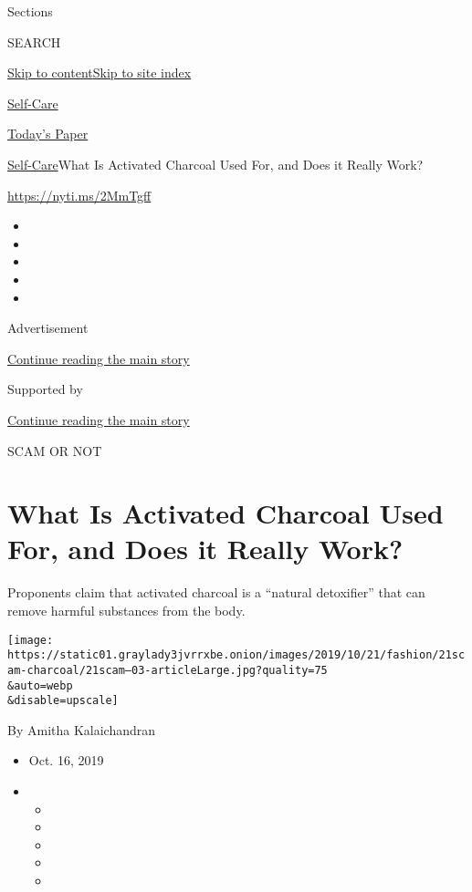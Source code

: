 Sections

SEARCH

\protect\hyperlink{site-content}{Skip to
content}\protect\hyperlink{site-index}{Skip to site index}

\href{https://www.nytimes3xbfgragh.onion/section/style/self-care/}{Self-Care}

\href{https://myaccount.nytimes3xbfgragh.onion/auth/login?response_type=cookie\&client_id=vi}{}

\href{https://www.nytimes3xbfgragh.onion/section/todayspaper}{Today's
Paper}

\href{/section/style/self-care/}{Self-Care}\textbar{}What Is Activated
Charcoal Used For, and Does it Really Work?

\url{https://nyti.ms/2MmTgff}

\begin{itemize}
\item
\item
\item
\item
\item
\end{itemize}

Advertisement

\protect\hyperlink{after-top}{Continue reading the main story}

Supported by

\protect\hyperlink{after-sponsor}{Continue reading the main story}

SCAM OR NOT

\hypertarget{what-is-activated-charcoal-used-for-and-does-it-really-work}{%
\section{What Is Activated Charcoal Used For, and Does it Really
Work?}\label{what-is-activated-charcoal-used-for-and-does-it-really-work}}

Proponents claim that activated charcoal is a ``natural detoxifier''
that can remove harmful substances from the body.

\texttt{[image: https://static01.graylady3jvrrxbe.onion/images/2019/10/21/fashion/21scam-charcoal/21scam--03-articleLarge.jpg?quality=75\\\&auto=webp\\\&disable=upscale]}

By Amitha Kalaichandran

\begin{itemize}
\item
  Oct. 16, 2019
\item
  \begin{itemize}
  \item
  \item
  \item
  \item
  \item
  \end{itemize}
\end{itemize}

